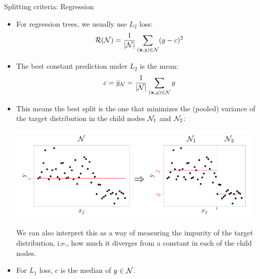 \begin{vbframe}{Splitting criteria: Regression}
\begin{itemize}
 \item For regression trees, we usually use $L_2$ loss:
  $$\mathcal{R}(\mathcal{N}) = \frac{1}{|\mathcal{N}|} \sum\limits_{(\mathbf{x},y) \in \mathcal{N}} (y - c)^2$$
 \item The best constant prediction under $L_2$ is the mean:
  $$c = \bar{y}_{\mathcal{N}} = \frac{1}{|\mathcal{N}|} \sum\limits_{(\mathbf{x},y) \in \mathcal{N}} y$$
\end{itemize}

\framebreak

\begin{itemize}
\item This means the best split is the one that minimizes the (pooled) variance of the target distribution in the child nodes $\mathcal{N}_1$ and $\mathcal{N}_2$:
\begin{knitrout}\scriptsize
{}\color{fgcolor}

{\centering \includegraphics[width=0.95\textwidth]{figure/cart_splitcriteria_2.pdf} 

}



\end{knitrout}
We can also interpret this as a way of measuring the impurity of the target distribution, i.e., how much it diverges from a constant in each of the child nodes.
\item For $L_1$ loss, $c$ is the median of $y \in \mathcal{N}$.
\end{itemize}
\end{vbframe}

